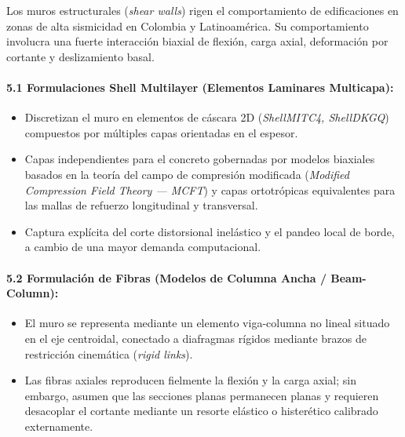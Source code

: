 \documentclass[11pt,letterpaper]{article}
\begin{document}
\begin{modulebox}
Los muros estructurales (\textit{shear walls}) rigen el comportamiento de edificaciones en zonas de alta sismicidad en Colombia y Latinoamérica. Su comportamiento involucra una fuerte interacción biaxial de flexión, carga axial, deformación por cortante y deslizamiento basal.

\paragraph{5.1 Formulaciones Shell Multilayer (Elementos Laminares Multicapa):}
\begin{itemize}
    \item Discretizan el muro en elementos de cáscara 2D (\textit{ShellMITC4, ShellDKGQ}) compuestos por múltiples capas orientadas en el espesor.
    \item Capas independientes para el concreto gobernadas por modelos biaxiales basados en la teoría del campo de compresión modificada (\textit{Modified Compression Field Theory --- MCFT}) y capas ortotrópicas equivalentes para las mallas de refuerzo longitudinal y transversal.
    \item Captura explícita del corte distorsional inelástico y el pandeo local de borde, a cambio de una mayor demanda computacional.
\end{itemize}

\paragraph{5.2 Formulación de Fibras (Modelos de Columna Ancha / Beam-Column):}
\begin{itemize}
    \item El muro se representa mediante un elemento viga-columna no lineal situado en el eje centroidal, conectado a diafragmas rígidos mediante brazos de restricción cinemática (\textit{rigid links}).
    \item Las fibras axiales reproducen fielmente la flexión y la carga axial; sin embargo, asumen que las secciones planas permanecen planas y requieren desacoplar el cortante mediante un resorte elástico o histerético calibrado externamente.
\end{itemize}


\end{modulebox}
\end{document}
